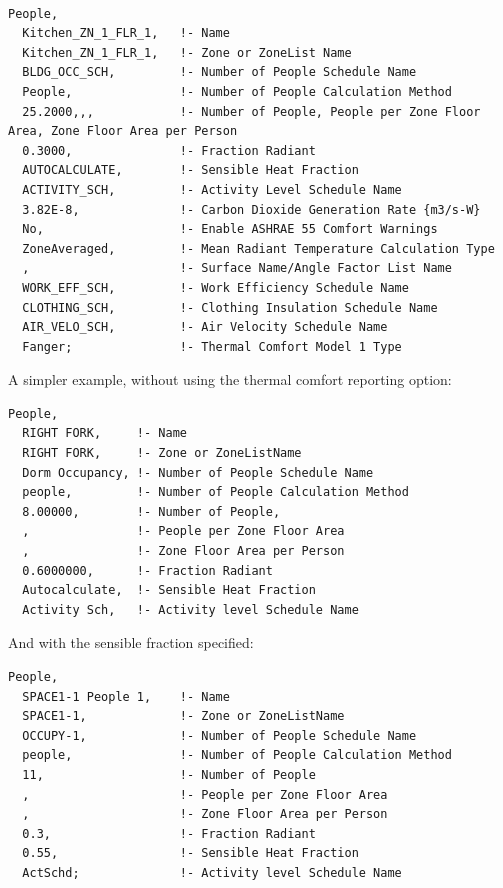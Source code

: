 \begin{lstlisting}

People,
  Kitchen_ZN_1_FLR_1,   !- Name
  Kitchen_ZN_1_FLR_1,   !- Zone or ZoneList Name
  BLDG_OCC_SCH,         !- Number of People Schedule Name
  People,               !- Number of People Calculation Method
  25.2000,,,            !- Number of People, People per Zone Floor Area, Zone Floor Area per Person
  0.3000,               !- Fraction Radiant
  AUTOCALCULATE,        !- Sensible Heat Fraction
  ACTIVITY_SCH,         !- Activity Level Schedule Name
  3.82E-8,              !- Carbon Dioxide Generation Rate {m3/s-W}
  No,                   !- Enable ASHRAE 55 Comfort Warnings
  ZoneAveraged,         !- Mean Radiant Temperature Calculation Type
  ,                     !- Surface Name/Angle Factor List Name
  WORK_EFF_SCH,         !- Work Efficiency Schedule Name
  CLOTHING_SCH,         !- Clothing Insulation Schedule Name
  AIR_VELO_SCH,         !- Air Velocity Schedule Name
  Fanger;               !- Thermal Comfort Model 1 Type
\end{lstlisting}

A simpler example, without using the thermal comfort reporting option:

\begin{lstlisting}
People,
  RIGHT FORK,     !- Name
  RIGHT FORK,     !- Zone or ZoneListName
  Dorm Occupancy, !- Number of People Schedule Name
  people,         !- Number of People Calculation Method
  8.00000,        !- Number of People,
  ,               !- People per Zone Floor Area
  ,               !- Zone Floor Area per Person
  0.6000000,      !- Fraction Radiant
  Autocalculate,  !- Sensible Heat Fraction
  Activity Sch,   !- Activity level Schedule Name
\end{lstlisting}

And with the sensible fraction specified:

\begin{lstlisting}
People,
  SPACE1-1 People 1,    !- Name
  SPACE1-1,             !- Zone or ZoneListName
  OCCUPY-1,             !- Number of People Schedule Name
  people,               !- Number of People Calculation Method
  11,                   !- Number of People
  ,                     !- People per Zone Floor Area
  ,                     !- Zone Floor Area per Person
  0.3,                  !- Fraction Radiant
  0.55,                 !- Sensible Heat Fraction
  ActSchd;              !- Activity level Schedule Name
\end{lstlisting}

